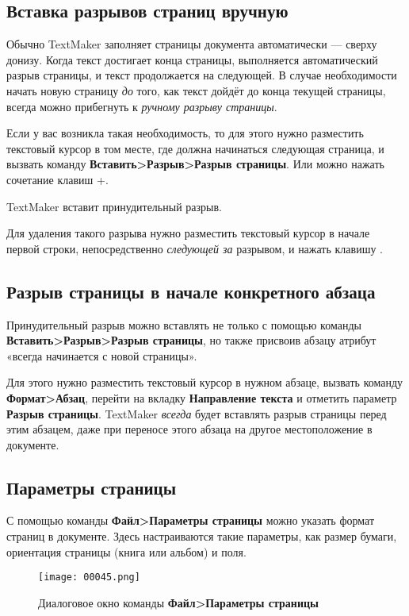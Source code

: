﻿\documentclass[a4paper,10pt]{article}
\begin{document}
\subsection{Вставка разрывов страниц вручную}
Обычно TextMaker заполняет страницы документа автоматически — сверху донизу. Когда текст достигает конца страницы, выполняется автоматический разрыв страницы, и текст продолжается на следующей. В случае необходимости начать новую страницу \textit{до} того, как текст дойдёт до конца текущей страницы, всегда можно прибегнуть к \textit{ручному разрыву страницы}.

Если у вас возникла такая необходимость, то для этого нужно разместить текстовый курсор в том месте, где должна начинаться следующая страница, и вызвать команду \textbf{Вставить>Разрыв>Разрыв страницы}. Или можно нажать сочетание клавиш +.

TextMaker вставит принудительный разрыв.

Для удаления такого разрыва нужно разместить текстовый курсор в начале первой строки, непосредственно \textit{следующей за} разрывом, и нажать клавишу .

\subsection{Разрыв страницы в начале конкретного абзаца}
Принудительный разрыв можно вставлять не только с помощью команды \textbf{Вставить>Разрыв>Разрыв страницы}, но также присвоив абзацу атрибут «всегда начинается с новой страницы».

Для этого нужно разместить текстовый курсор в нужном абзаце, вызвать команду \textbf{Формат>Абзац}, перейти на вкладку \textbf{Направление текста} и отметить параметр \textbf{Разрыв страницы}. TextMaker \textit{всегда} будет вставлять разрыв страницы перед этим абзацем, даже при переносе этого абзаца на другое местоположение в документе.

\subsection{Параметры страницы} \label{sec:парамстр}
С помощью команды \textbf{Файл>Параметры страницы} можно указать формат страниц в документе. Здесь настраиваются такие параметры, как размер бумаги, ориентация страницы (книга или альбом) и поля.

\begin{figure}[ht]
\texttt{[image: 00045.png]}
\centering
\caption{Диалоговое окно команды \textbf{Файл>Параметры страницы}}
\end{figure}
\end{document}
